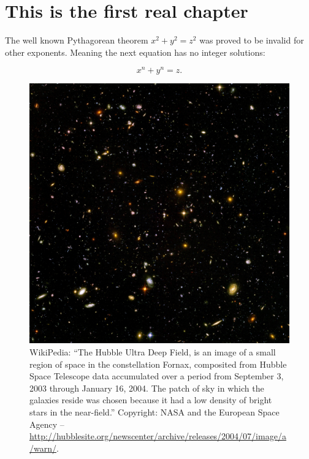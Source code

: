 \chapter{This is the first real chapter}


\lipsum[1-2]


The well known Pythagorean theorem \(x^2 + y^2 = z^2\) was 
proved to be invalid for other exponents. 
Meaning the next equation has no integer solutions:

\begin{equation}
	x^n + y^n = z
	.
\end{equation}
\lipsum[3-4]

\begin{figure}[h]
\includegraphics[width=\textwidth]{./chapters/chapter1/figures/Hubble_ultra_deep_field.jpg}
\caption{WikiPedia: ``The Hubble Ultra Deep Field, is an image of a small region of space in the constellation Fornax, composited from Hubble Space Telescope data accumulated over a period from September 3, 2003 through January 16, 2004. The patch of sky in which the galaxies reside was chosen because it had a low density of bright stars in the near-field.'' Copyright: NASA and the European Space Agency -- \url{http://hubblesite.org/newscenter/archive/releases/2004/07/image/a/warn/}.}
\end{figure}
